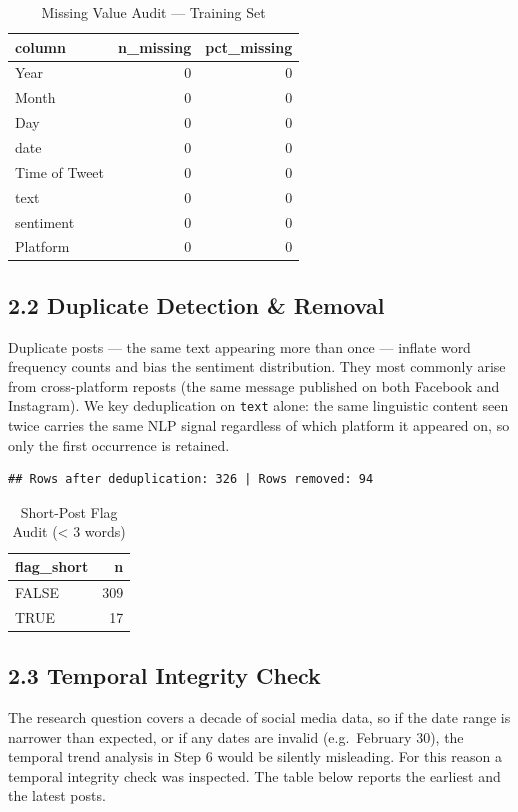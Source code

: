 \documentclass[
]{article}
\begin{document}
\begin{longtable}[t]{lrr}
\caption{\label{tab:data-quality}Missing Value Audit — Training Set}\\
\toprule
column & n\_missing & pct\_missing\\
\midrule
Year & 0 & 0\\
Month & 0 & 0\\
Day & 0 & 0\\
date & 0 & 0\\
Time of Tweet & 0 & 0\\
\addlinespace
text & 0 & 0\\
sentiment & 0 & 0\\
Platform & 0 & 0\\
\bottomrule
\end{longtable}

\subsection{2.2 Duplicate Detection \&
Removal}\label{duplicate-detection-removal}

Duplicate posts --- the same text appearing more than once --- inflate
word frequency counts and bias the sentiment distribution. They most
commonly arise from cross-platform reposts (the same message published
on both Facebook and Instagram). We key deduplication on \texttt{text}
alone: the same linguistic content seen twice carries the same NLP
signal regardless of which platform it appeared on, so only the first
occurrence is retained.

\begin{verbatim}
## Rows after deduplication: 326 | Rows removed: 94
\end{verbatim}

\begin{longtable}[t]{lr}
\caption{\label{tab:duplicates}Short-Post Flag Audit (< 3 words)}\\
\toprule
flag\_short & n\\
\midrule
FALSE & 309\\
TRUE & 17\\
\bottomrule
\end{longtable}

\subsection{2.3 Temporal Integrity
Check}\label{temporal-integrity-check}

The research question covers a decade of social media data, so if the
date range is narrower than expected, or if any dates are invalid
(e.g.~February 30), the temporal trend analysis in Step 6 would be
silently misleading. For this reason a temporal integrity check was
inspected. The table below reports the earliest and the latest posts.
\end{document}
